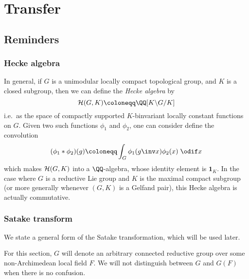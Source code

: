 \chapter{Transfer}
\section{Reminders}
\subsection{Hecke algebra}
In general, if $G$ is a unimodular locally compact topological group,
and $K$ is a closed subgroup, then we can define the \emph{Hecke algebra} by
\[ \HH(G, K) \coloneqq \QQ[K \backslash G \slash K] \]
i.e.\ as the space of compactly supported $K$-binvariant locally constant functions on $G$.
Given two such functions $\phi_1$ and $\phi_2$, one can consider define the convolution
\[ (\phi_1 \ast \phi_2)(g) \coloneqq \int_G \phi_1(g\inv x) \phi_2(x) \; \odif x \]
which makes $\mathcal H(G, K)$ into a $\QQ$-algebra,
whose identity element is $\mathbf{1}_K$.
In the case where $G$ is a reductive Lie group and
$K$ is the maximal compact subgroup
(or more generally whenever $(G,K)$ is a Gelfand pair),
this Hecke algebra is actually commutative.

\subsection{Satake transform}
We state a general form of the Satake transformation, which will be used later.

For this section, $G$ will denote an arbitrary connected reductive group
over some non-Archimedean local field $F$.
We will not distinguish between $G$ and $G(F)$ when there is no confusion.

